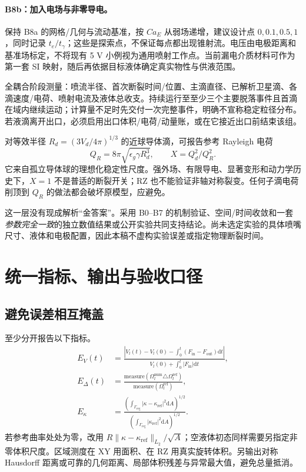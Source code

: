 \documentclass[11pt,a4paper]{article}
\newcommand{\dd}{\mathrm{d}}
\begin{document}
\paragraph{B8b：加入电场与非零导电。}
保持 B8a 的网格/几何与流动基准，按 $Ca_E$ 从弱场递增，建议设计点 $0,0.1,0.5,1$，同时记录 $t_e/t_\gamma$；这些是探索点，不保证每点都出现锥射流。电压由电极距离和基准场标定，不将现有 5 V 小例视为通用喷射工作点。当前漏电介质材料可作为第一套 SI 映射，随后再依据目标液体确定真实物性与供液范围。

全耦合阶段测量：喷流半径、首次断裂时间/位置、主滴直径、已解析卫星滴、各滴速度/电荷、喷射电流及液体总收支。持续运行至至少三个主要脱落事件且首滴在域内继续运动；计算量不足时先交付一次完整事件，明确不宣称稳定粒径分布。若液滴离开出口，必须启用出口体积/电荷/动量账，或在它接近出口前结束该组。

对等效半径 $R_d=(3V_d/4\pi)^{1/3}$ 的近球导体滴，可报告参考 Rayleigh 电荷
\begin{equation}
Q_R=8\pi\sqrt{\epsilon_g\gamma R_d^3},\qquad X=Q_d^2/Q_R^2.
\end{equation}
它来自孤立导体球的理想化稳定性尺度\cite{rayleigh2023}。强外场、有限导电、显著变形和动力学历史下，$X=1$ 不是普适的断裂开关；RZ 也不能验证非轴对称裂变。任何子滴电荷削顶到 $Q_R$ 的做法都会破坏原模型，应避免。

这一层没有现成解析“金答案”。采用 B0--B7 的机制验证、空间/时间收敛和一套\emph{参数完全一致}的独立数值结果或公开实验共同支持结论。尚未选定实验的具体喷嘴尺寸、液体和电极配置，因此本稿不虚构实验误差或指定物理断裂时间。

\section{统一指标、输出与验收口径}
\subsection{避免误差相互掩盖}
至少分开报告以下指标。
\begin{align}
E_V(t)&=\frac{|V_l(t)-V_l(0)-\int_0^t(F_{\mathrm{in}}-F_{\mathrm{out}})\dd t|}
{V_l(0)+\int_0^t|F_{\mathrm{in}}|\dd t},\\
E_\Delta(t)&=\frac{\mathrm{measure}(\Omega_l^{\mathrm{num}}\triangle\Omega_l^{\mathrm{ref}})}
{\mathrm{measure}(\Omega_l^{\mathrm{ref}})},\\
E_\kappa&=\frac{\left(\int_{\Gamma_{\mathrm{reg}}}|\kappa-\kappa_{\mathrm{ref}}|^2\dd A\right)^{1/2}}
{\left(\int_{\Gamma_{\mathrm{reg}}}|\kappa_{\mathrm{ref}}|^2\dd A\right)^{1/2}}.
\end{align}
若参考曲率处处为零，改用 $R\|\kappa-\kappa_{\mathrm{ref}}\|_{L_2}/\sqrt{A}$；空液体初态同样需要另指定非零体积尺度。区域测度在 XY 用面积、在 RZ 用真实旋转体积。另输出对称 Hausdorff 距离或可靠的几何距离、局部体积残差与异常最大值，避免总量抵消。
\end{document}
